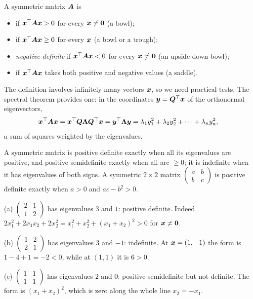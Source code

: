 \begin{definition}[Definiteness]\label{def:positive-definite}
A symmetric matrix $\bm{A}$ is
\begin{itemize}
  \item {} if
    $\bm{x}^\top\bm{A}\bm{x} > 0$ for every $\bm{x} \neq \bm{0}$ (a bowl);
  \item {} if
    $\bm{x}^\top\bm{A}\bm{x} \ge 0$ for every $\bm{x}$ (a bowl or a trough);
  \item \emph{negative definite} if $\bm{x}^\top\bm{A}\bm{x} < 0$ for every
    $\bm{x} \neq \bm{0}$ (an upside-down bowl);
  \item {} if $\bm{x}^\top\bm{A}\bm{x}$ takes both
    positive and negative values (a saddle).
\end{itemize}
\end{definition}

The definition involves infinitely many vectors $\bm{x}$, so we need practical
tests. The spectral theorem provides one: in the coordinates
$\bm{y} = \bm{Q}^\top\bm{x}$ of the orthonormal eigenvectors,
\[
  \bm{x}^\top\bm{A}\bm{x} = \bm{x}^\top\bm{Q}\bm{\Lambda}\bm{Q}^\top\bm{x} = \bm{y}^\top\bm{\Lambda}\bm{y}
  = \lambda_1y_1^2 + \lambda_2y_2^2 + \dots + \lambda_ny_n^2 ,
\]
a sum of squares weighted by the eigenvalues.

\begin{theorem}\label{thm:definiteness-tests}
A symmetric matrix is positive definite exactly when all its eigenvalues are
positive, and positive semidefinite exactly when all are $\ge 0$; it is
indefinite when it has eigenvalues of both signs. A symmetric $2\times2$ matrix
$\left(\begin{smallmatrix} a & b\\ b & c\end{smallmatrix}\right)$ is positive
definite exactly when $a > 0$ and $ac - b^2 > 0$.
\end{theorem}

\begin{example}\label{ex:definiteness}
(a) $\left(\begin{smallmatrix} 2 & 1\\ 1 & 2\end{smallmatrix}\right)$ has
eigenvalues $3$ and $1$: positive definite. Indeed
$2x_1^2 + 2x_1x_2 + 2x_2^2 = x_1^2 + x_2^2 + (x_1 + x_2)^2 > 0$ for
$\bm{x} \neq \bm{0}$.

(b) $\left(\begin{smallmatrix} 1 & 2\\ 2 & 1\end{smallmatrix}\right)$ has
eigenvalues $3$ and $-1$: indefinite. At $\bm{x} = (1, -1)$ the form is
$1 - 4 + 1 = -2 < 0$, while at $(1, 1)$ it is $6 > 0$.

(c) $\left(\begin{smallmatrix} 1 & 1\\ 1 & 1\end{smallmatrix}\right)$ has
eigenvalues $2$ and $0$: positive semidefinite but not definite. The form is
$(x_1 + x_2)^2$, which is zero along the whole line $x_2 = -x_1$.
\end{example}


